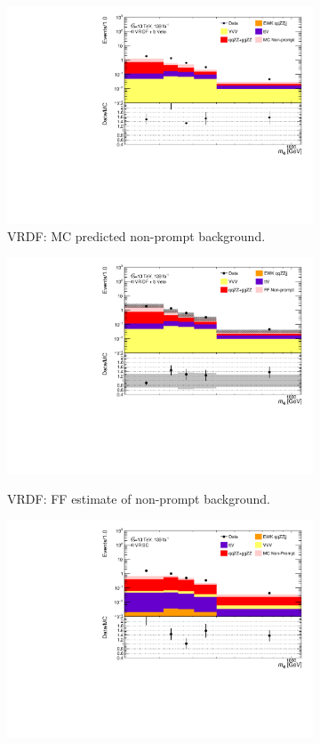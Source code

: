 \begin{figure}[!htbp]
    \centering
    \begin{subfigure}{.49\textwidth}
        \centering
        \includegraphics[width = 0.85\linewidth]{figures/Analysis/Background/Overlay_VRDF_RedMC_M4l.pdf}
        \caption{VRDF: MC predicted non-prompt background.\label{subfig:VRDFMCRed}}
    \end{subfigure}
    \begin{subfigure}{.49\textwidth}
        \centering
        \includegraphics[width = 0.85\linewidth]{figures/Analysis/Background/Overlay_VRDF_FFApplied_M4l.pdf}\\
        \caption{ VRDF: FF estimate of non-prompt background. \label{subfig:VRDFFF} }
    \end{subfigure}
    \begin{subfigure}{.49\textwidth}
        \centering
        \includegraphics[width = 0.85\linewidth]{figures/Analysis/Background/Overlay_VRSC_RedMC_M4l.pdf}

\end{subfigure}
\end{figure}
